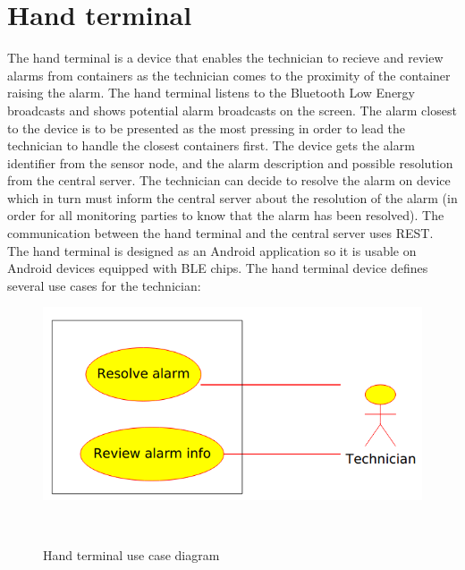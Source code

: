 \smallskip

\section{Hand terminal}
\label{sec:terminal}

The hand terminal is a device that enables the technician to recieve and review alarms from containers as the technician comes to the proximity of the container raising the alarm. The hand terminal listens to the Bluetooth Low Energy broadcasts and shows potential alarm broadcasts on the screen. The alarm closest to the device is to be presented as the most pressing in order to lead the technician to handle the closest containers first. The device gets the alarm identifier from the sensor node, and the alarm description and possible resolution from the central server. The technician can decide to resolve the alarm on device which in turn must inform the central server about the resolution of the alarm (in order for all monitoring parties to know that the alarm has been resolved). The communication between the hand terminal and the central server uses REST. The hand terminal is designed as an Android application so it is usable on Android devices equipped with BLE chips. The hand terminal device defines several use cases for the technician:

\begin{figure}[H]
\centering
\includegraphics[scale=0.6]{gfx/handterminal}
\caption{Hand terminal use case diagram}~\label{fig:handterminal}
\end{figure}

